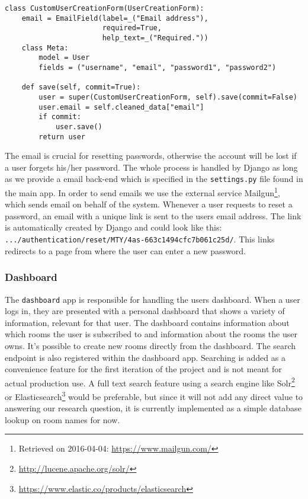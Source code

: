 \begin{lstlisting}[caption=CustomUserCreationForm class, label=lst:custom-user-creation-form-class]
class CustomUserCreationForm(UserCreationForm):
    email = EmailField(label=_("Email address"),
                       required=True, 
                       help_text=_("Required."))
    class Meta:
        model = User
        fields = ("username", "email", "password1", "password2")

    def save(self, commit=True):
        user = super(CustomUserCreationForm, self).save(commit=False)
        user.email = self.cleaned_data["email"]
        if commit:
            user.save()
        return user
\end{lstlisting}

The email is crucial for resetting passwords, otherwise the account will be lost if a user forgets his/her password. The whole process is handled by Django as long as we provide a email back-end which is specified in the \texttt{settings.py} file found in the main app. In order to send emails we use the external service Mailgun\footnote{Retrieved on 2016-04-04: \url{https://www.mailgun.com/}}, which sends email on behalf of the system. Whenever a user requests to reset a password, an email with a unique link is sent to the users email address. The link is automatically created by Django and could look like this:  \texttt{.../authentication/reset/MTY/4as-663c1494cfc7b061c25d/}. This links redirects to a page from where the user can enter a new password.

\subsubsection*{Dashboard}
The \texttt{dashboard} app is responsible for handling the users dashboard. When a user logs in, they are presented with a personal dashboard that shows a variety of information, relevant for that user.
The dashboard contains information about which rooms the user is subscribed to and information about the rooms the user owns. It's possible to create new rooms directly from the dashboard. The search endpoint is also registered within the dashboard app. Searching is added as a convenience feature for the first iteration of the project and is not meant for actual production use. A full text search feature using a search engine like Solr\footnote{\url{http://lucene.apache.org/solr/}} or Elasticsearch\footnote{\url{https://www.elastic.co/products/elasticsearch}} would be preferable, but since it will not add any direct value to answering our research question, it is currently implemented as a simple database lookup on room names for now.

